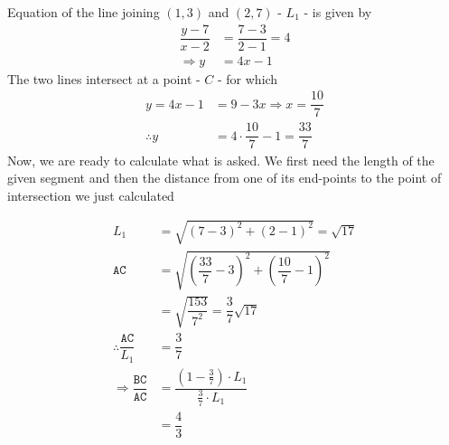 \begin{solution}[\fullpage]
	Equation of the line joining $(1,3)$ and $(2,7)$ - $L_1$ - is given by 
	\begin{align}
		\dfrac{y-7}{x-2} &= \dfrac{7-3}{2-1} = 4 \\
		\Rightarrow y &= 4x - 1
	\end{align}
	The two lines intersect at a point - $C$ - for which
	\begin{align}
		y = 4x - 1 &= 9-3x \Rightarrow x = \dfrac{10}{7} \\
		\therefore y &= 4\cdot\dfrac{10}{7}-1 = \dfrac{33}{7}
	\end{align}
	Now, we are ready to calculate what is asked. We first need the length
	of the given segment and then the distance from one of its end-points to
	the point of intersection we just calculated 
	
	\begin{align}
		\texttt{$L_1$} &= \sqrt{(7-3)^2+(2-1)^2} = \sqrt{17} \\
		\texttt{AC} &= \sqrt{(\dfrac{33}{7}-3)^2+(\dfrac{10}{7}-1)^2} \\
		&= \sqrt{\dfrac{153}{7^2}} = \dfrac{3}{7}\sqrt{17} \\
		\therefore\dfrac{\texttt{AC}}{L_1} &= \dfrac{3}{7} \\
		\Rightarrow\dfrac{\texttt{BC}}{\texttt{AC}} &= \dfrac{(1-\frac{3}{7})\cdot L_1}{\frac{3}{7}\cdot L_1}\\
		&= \dfrac{4}{3}
	\end{align}
	
\end{solution}
